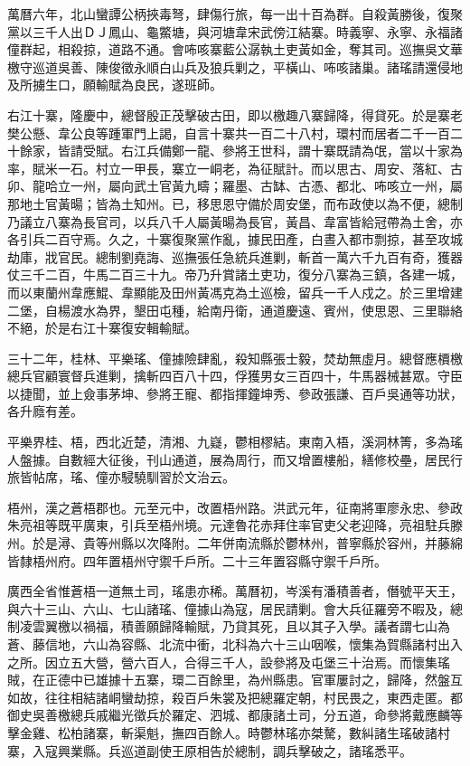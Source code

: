\begin{pinyinscope}
萬曆六年，北山蠻譚公柄挾毒弩，肆傷行旅，每一出十百為群。自殺黃勝後，復聚黨以三千人出ＤＪ鳳山、龜鱉塘，與河塘韋宋武傍江結寨。時義寧、永寧、永福諸僮群起，相殺掠，道路不通。會咘咳寨藍公潺執土吏黃如金，奪其司。巡撫吳文華檄守巡道吳善、陳俊徵永順白山兵及狼兵剿之，平橫山、咘咳諸巢。諸瑤請還侵地及所擄生口，願輸賦為良民，遂班師。

右江十寨，隆慶中，總督殷正茂擊破古田，即以檄趣八寨歸降，得貸死。於是寨老樊公懸、韋公良等踵軍門上謁，自言十寨共一百二十八村，環村而居者二千一百二十餘家，皆請受賦。右江兵備鄭一龍、參將王世科，謂十寨既請為氓，當以十家為率，賦米一石。村立一甲長，寨立一峒老，為征賦計。而以思古、周安、落紅、古卯、龍哈立一州，屬向武土官黃九疇；羅墨、古缽、古憑、都北、咘咳立一州，屬那地土官黃暘；皆為土知州。已，移思恩守備於周安堡，而布政使以為不便，總制乃議立八寨為長官司，以兵八千人屬黃暘為長官，黃昌、韋富皆給冠帶為土舍，亦各引兵二百守焉。久之，十寨復聚黨作亂，據民田產，白晝入都市剽掠，甚至攻城劫庫，戕官民。總制劉堯誨、巡撫張任急統兵進剿，斬首一萬六千九百有奇，獲器仗三千二百，牛馬二百三十九。帝乃升賞諸土吏功，復分八寨為三鎮，各建一城，而以東蘭州韋應鯤、韋顯能及田州黃馮克為土巡檢，留兵一千人戍之。於三里增建二堡，自楊渡水為界，墾田屯種，給南丹衛，通道慶遠、賓州，使思恩、三里聯絡不絕，於是右江十寨復安輯輸賦。

三十二年，桂林、平樂瑤、僮據險肆亂，殺知縣張士毅，焚劫無虛月。總督應檟檄總兵官顧寰督兵進剿，擒斬四百八十四，俘獲男女三百四十，牛馬器械甚眾。守臣以捷聞，並上僉事茅坤、參將王寵、都指揮鐘坤秀、參政張謙、百戶吳通等功狀，各升廕有差。

平樂界桂、梧，西北近楚，清湘、九嶷，鬱相樛結。東南入梧，溪洞林箐，多為瑤人盤據。自數經大征後，刊山通道，展為周行，而又增置樓船，繕修校壘，居民行旅皆帖席，瑤、僮亦駸驍馴習於文治云。

梧州，漢之蒼梧郡也。元至元中，改置梧州路。洪武元年，征南將軍廖永忠、參政朱亮祖等既平廣東，引兵至梧州境。元達魯花赤拜住率官吏父老迎降，亮祖駐兵滕州。於是潯、貴等州縣以次降附。二年併南流縣於鬱林州，普寧縣於容州，并藤綿皆隸梧州府。四年置梧州守禦千戶所。二十三年置容縣守禦千戶所。

廣西全省惟蒼梧一道無土司，瑤患亦稀。萬曆初，岑溪有潘積善者，僭號平天王，與六十三山、六山、七山諸瑤、僮據山為寇，居民請剿。會大兵征羅旁不暇及，總制凌雲翼檄以禍福，積善願歸降輸賦，乃貸其死，且以其子入學。議者謂七山為蒼、藤信地，六山為容縣、北流中衝，北科為六十三山咽喉，懷集為賀縣諸村出入之所。因立五大營，營六百人，合得三千人，設參將及屯堡三十治焉。而懷集瑤賊，在正德中已雄據十五寨，環二百餘里，為州縣患。官軍屢討之，歸降，然盤互如故，往往相結諸峒蠻劫掠，殺百戶朱裳及把總羅定朝，村民畏之，東西走匿。都御史吳善檄總兵戚繼光徵兵於羅定、泗城、都康諸土司，分五道，命參將戴應麟等擊金雞、松柏諸寨，斬渠魁，撫四百餘人。時鬱林瑤亦桀驁，數糾諸生瑤破諸村寨，入寇興業縣。兵巡道副使王原相告於總制，調兵擊破之，諸瑤悉平。


\end{pinyinscope}
